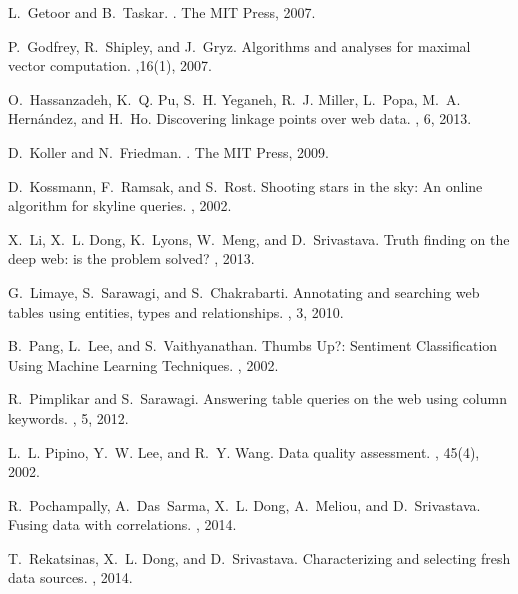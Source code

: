 \documentclass{sig-alternate}
\begin{document}
\begin{thebibliography}{10}
L.~Getoor and B.~Taskar.
.
\newblock The MIT Press, 2007.

P.~Godfrey, R.~Shipley, and J.~Gryz.
\newblock Algorithms and analyses for maximal vector computation.
,16(1), 2007.

O.~Hassanzadeh, K.~Q. Pu, S.~H. Yeganeh, R.~J. Miller, L.~Popa, M.~A.
  Hern{\'a}ndez, and H.~Ho.
\newblock Discovering linkage points over web data.
, 6, 2013.


D.~Koller and N.~Friedman.
.
\newblock The MIT Press, 2009.

D.~Kossmann, F.~Ramsak, and S.~Rost.
\newblock Shooting stars in the sky: An online algorithm for skyline queries.
, 2002.

X.~Li, X.~L. Dong, K.~Lyons, W.~Meng, and D.~Srivastava.
\newblock Truth finding on the deep web: is the problem solved?
, 2013.

G.~Limaye, S.~Sarawagi, and S.~Chakrabarti.
\newblock Annotating and searching web tables using entities, types and
  relationships.
, 3, 2010.

B.~Pang, L.~Lee, and S.~Vaithyanathan.
\newblock Thumbs Up?: Sentiment Classification Using Machine Learning Techniques.
, 2002.

R.~Pimplikar and S.~Sarawagi.
\newblock Answering table queries on the web using column keywords.
, 5, 2012.

L.~L. Pipino, Y.~W. Lee, and R.~Y. Wang.
\newblock Data quality assessment.
, 45(4), 2002.

R.~Pochampally, A.~Das~Sarma, X.~L. Dong, A.~Meliou, and D.~Srivastava.
\newblock Fusing data with correlations.
, 2014.

T.~Rekatsinas, X.~L. Dong, and D.~Srivastava.
\newblock Characterizing and selecting fresh data sources.
, 2014.


\end{thebibliography}
\end{document}
